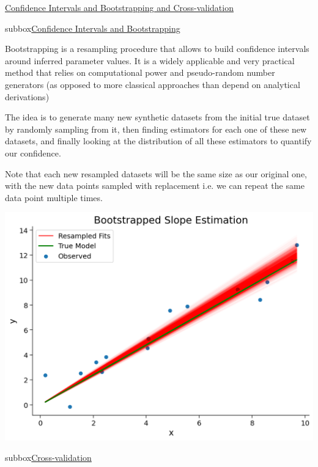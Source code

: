 \begin{textbox}{\href{https://compneuro.neuromatch.io/tutorials/W1D2_ModelFitting/student/W1D2_Tutorial2.html}{Confidence Intervals and Bootstrapping and Cross-validation}}
\begin{subbox}{subbox}{\href{https://compneuro.neuromatch.io/tutorials/W1D2_ModelFitting/student/W1D2_Tutorial3.html}{Confidence Intervals and Bootstrapping }  }

\scriptsize

 Bootstrapping is a resampling procedure that allows to build confidence intervals around inferred parameter values.
It is a widely applicable and very practical method that relies on computational power and pseudo-random number generators (as opposed to more classical approaches than depend on analytical derivations)

The idea is to generate many new synthetic datasets from the initial true dataset by randomly sampling from it, then finding estimators for each one of these new datasets, and finally looking at the distribution of all these estimators to quantify our confidence.

Note that each new resampled datasets will be the same size as our original one, with the new data points sampled with replacement i.e. we can repeat the same data point multiple times. 

\centering
\includegraphics[scale=0.2]{Figures/ModelFitting/MFFigure3.png}

\end{subbox}
\begin{subbox}{subbox}{\href{https://compneuro.neuromatch.io/tutorials/W1D2_ModelFitting/student/W1D2_Tutorial6.html}{Cross-validation }  }


\end{subbox}
\end{textbox}
